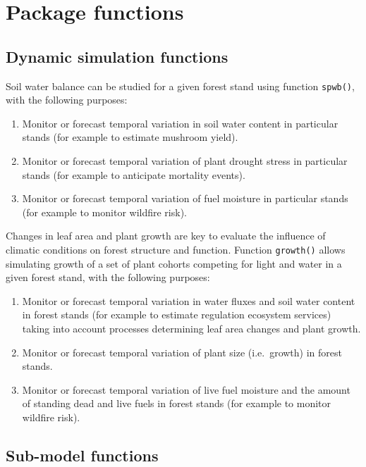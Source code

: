 \documentclass[]{book}
\providecommand{\tightlist}{%
  \setlength{\itemsep}{0pt}\setlength{\parskip}{0pt}}
\begin{document}
\section{Package functions}\label{package-functions}

\subsection{Dynamic simulation
functions}\label{dynamic-simulation-functions}

Soil water balance can be studied for a given forest stand using
function \texttt{spwb()}, with the following purposes:

\begin{enumerate}
\def\labelenumi{\arabic{enumi}.}
\tightlist
\item
  Monitor or forecast temporal variation in soil water content in
  particular stands (for example to estimate mushroom yield).
\item
  Monitor or forecast temporal variation of plant drought stress in
  particular stands (for example to anticipate mortality events).
\item
  Monitor or forecast temporal variation of fuel moisture in particular
  stands (for example to monitor wildfire risk).
\end{enumerate}

Changes in leaf area and plant growth are key to evaluate the influence
of climatic conditions on forest structure and function. Function
\texttt{growth()} allows simulating growth of a set of plant cohorts
competing for light and water in a given forest stand, with the
following purposes:

\begin{enumerate}
\def\labelenumi{\arabic{enumi}.}
\tightlist
\item
  Monitor or forecast temporal variation in water fluxes and soil water
  content in forest stands (for example to estimate regulation ecosystem
  services) taking into account processes determining leaf area changes
  and plant growth.
\item
  Monitor or forecast temporal variation of plant size (i.e.~growth) in
  forest stands.
\item
  Monitor or forecast temporal variation of live fuel moisture and the
  amount of standing dead and live fuels in forest stands (for example
  to monitor wildfire risk).
\end{enumerate}

\subsection{Sub-model functions}\label{sub-model-functions}
\end{document}
